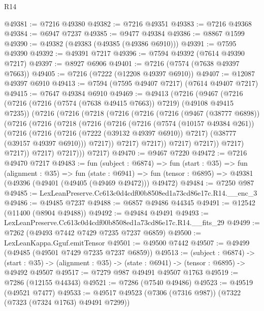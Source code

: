 \begin{lexlean}{R14}
\begin{coremodule}
@49381 := @7216 @49380
@49382 := @7216 @49351
@49383 := @7216 @49368
@49384 := @6947 @7237
@49385 := @9477 @49384
@49386 := @8867 @1599
@49390 := @49382 (@49383 (@49385 (@49386 @6910)))
@49391 := @7595 @49390
@49392 := @49391 @7217
@49396 := @7594 @49392 (@7614 @49390 @7217)
@49397 := @8927 @6906
@49401 := @7216 (@7574 (@7638 @49397 @7663))
@49405 := @7216 (@7222 (@12208 @49397 @6910))
@49407 := @12087 @49397 @6910
@49413 := @7594 (@7595 @49407 @7217) (@7614 @49407 @7217)
@49415 := @7647 @49384 @6910
@49469 := @49413
    (@7216
      (@9467
        (@7216
          (@7216 (@7216 (@7574 (@7638 @49415 @7663)) @7219) (@49108 @49415 @7235))
          (@7216
            (@7216
              (@7218
                (@7216
                  (@7216
                    (@7216
                      (@9467 (@38777 @6898))
                      (@7216
                        (@7216
                          (@7218
                            (@7216
                              (@7216
                                (@7216
                                  (@7574 (@10157 @49384 @261))
                                  (@7216
                                    (@7216
                                      (@7216 (@7222 (@39132 @49397 @6910)) @7217)
                                      (@38777 (@39157 @49397 @6910)))
                                    @7217))
                                @7217)
                              @7217))
                          @7217)
                        @7217))
                    @7217)
                  @7217))
              @7217)
            @7217)))
      @7217)
@49470 := @9467 @7220
@49472 := @7216 @49470 @7217
@49483 := fun (subject : @6874) =>
  fun (start : @35) =>
  fun (alignment : @35) =>
  fun (state : @6941) =>
  fun (tensor : @6895) => @49381 (@49396 (@49401 (@49405 (@49469 @49472))) @49472)
@49484 := @7250 @987
@49485 := LexLeanPreserve.Cc613c0d4cdf00b8508ed1a73cd86e17c.R14.__enc_3
@49486 := @49485 @7237
@49488 := @6857 @49486 @44345
@49491 := @12542 (@11400 (@8904 @49488))
@49492 := @49484 @49491
@49493 := LexLeanPreserve.Cc613c0d4cdf00b8508ed1a73cd86e17c.R14.__fits_29
@49499 := @7262 (@49493 @7442 @7429 @7235 @7237 @6859)
@49500 := LexLeanKappa.Gguf.emitTensor
@49501 := @49500 @7442
@49507 := @49499 (@49485 (@49501 @7429 @7235 @7237 @6859))
@49513 := (subject : @6874) ->
  (start : @35) -> (alignment : @35) -> (state : @6941) -> (tensor : @6895) -> @49492 @49507
@49517 := @7279 @987 @49491 @49507 @1763
@49519 := @7286 (@12155 @44343)
@49521 := @7286 (@7540 @49486)
@49523 := @49519 (@49521 @7477)
@49533 := @49517 @49523 (@7306 (@7316 @987)) (@7322 (@7323 (@7324 @1763) @49491 @7299))

\end{coremodule}
\end{lexlean}
